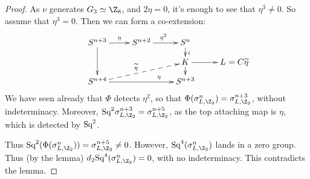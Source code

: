 \documentclass[11pt]{article}
\begin{document}
\begin{proof}
As $\nu$ generates $G_3\simeq\Z_8$, and $2\eta=0$, it's enough to see that
$\eta^3\neq0$. So assume that $\eta^3=0$. Then we can form a co-extension:
\[\xymatrix@R=.3cm{
\ar[dd]S^{n+3}\ar[r]^\eta&S^{n+2}\ar[r]^{\eta^2}&S^n\ar[d]^i\\
&&K\ar[r]\ar[d]&L\makebox[0cm][l]{\ $=C\widetilde\eta$}\\
S^{n+4}\ar@{-->}[rru]^(.45){\widetilde\eta}
\ar[rr]^(.7){\eta}&&S^{n+3}
}\]
We have seen already that $\Phi$ detects $\eta^2$, so that
$\Phi(\sigma^n_{L,\Z_2})=\sigma^{n+3}_{L,\Z_2}$, without indeterminacy.
Moreover, $\Squ^2\sigma^{n+3}_{L,\Z_2}=\sigma^{n+5}_{L,\Z_2}$, as the top
attaching map is $\eta$, which is detected by $\textup{Sq}^2$.

Thus $\Squ^2(\Phi(\sigma^{n}_{L,\Z_2}))=\sigma^{n+5}_{L,\Z_2}\neq0$. However,
$\Squ^4(\sigma^{n}_{L,\Z_2})$ lands in a zero group. Thus (by the lemma)
$d_2\Squ^4(\sigma^{n}_{L,\Z_2})=0$, with no indeterminacy. This contradicts the
lemma.
\end{proof}
\end{document}
